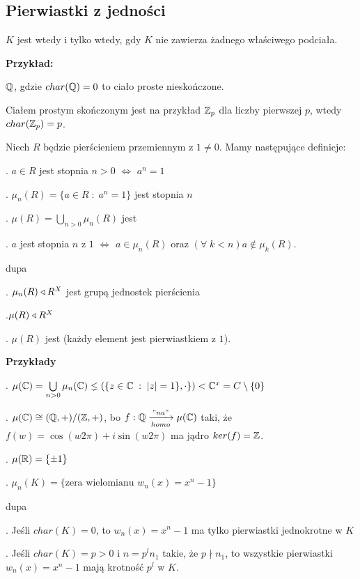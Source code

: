 \subsection{Pierwiastki z jedności}

$K$ jest  wtedy i tylko wtedy, gdy $K$ nie zawierza żadnego właściwego podciała. 

\textbf{Przykład:}

\indent \point $\mathbb{Q}$, gdzie $char(\mathbb{Q})=0$ to ciało proste nieskończone.

\indent \point Ciałem prostym skończonym jest na przykład $\mathbb{Z}_p$ dla liczby pierwszej $p$, wtedy $char(\mathbb{Z}_p)=p$.
\medskip

Niech $R$ będzie pierścieniem przemiennym z $1\neq0$. Mamy następujące definicje:

. $a\in R$ jest stopnia $n>0$ $\iff$ $a^n=1$

. $\mu_n(R)=\{a\in R\;:\;a^n=1\}$ jest  stopnia $n$

. $\mu(R)=\bigcup\limits_{n>0}\mu_n(R)$ jest 

. $a$ jest  stopnia $n$ z $1$ $\iff$ $a\in\mu_n(R)$ oraz $(\forall\;k<n)a\notin\mu_k(R)$.

\begin{uwaga}{\color{back}dupa}

. $\mu_n(R)\triangleleft R^X$ jest grupą jednostek pierścienia

.$\mu(R)\triangleleft R^X$

. $\mu(R)$ jest  (każdy element jest pierwiastkiem z $1$).
\end{uwaga}

\textbf{Przykłady}

. $\mu(\mathbb{C})=\bigcup\limits_{n>0}\mu_n(\mathbb{C})\lneq(\{z\in\mathbb{C}\;:\;|z|=1\},\cdot\})<\mathbb{C}^x=C\setminus\{0\}$

. $\mu(\mathbb{C})\cong(\mathbb{Q},+)/(\mathbb{Z},+)$, bo $f:\mathbb{Q}\xrightarrow[homo]{"na"}\mu(\mathbb{C})$ taki, że $f(w)=\cos(w2\pi)+i\sin(w2\pi)$ ma jądro $ker(f)=\mathbb{Z}$.

. $\mu(\mathbb{R})=\{\pm1\}$

. $\mu_n(K)=\{\text{zera wielomianu }w_n(x)=x^n-1\}$

\begin{uwaga}{\color{back}dupa}
    \label{uwaga:2:6}

. Jeśli $char(K)=0$, to $w_n(x)=x^n-1$ ma tylko pierwiastki jednokrotne w $K$

. Jeśli $char(K)=p>0$ i $n=p^ln_1$ takie, że $p\nmid n_1$, to wszystkie pierwiastki $w_n(x)=x^n-1$ mają krotność $p^l$ w $K$.
\end{uwaga}

